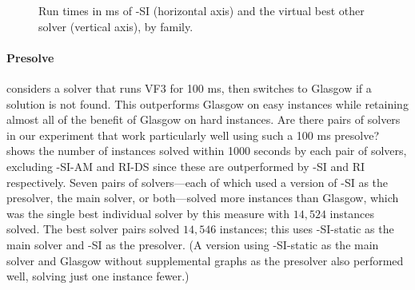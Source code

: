 \begin{figure}[htb]
    \caption{Run times in ms of \McSplit-SI (horizontal axis) and the virtual best other solver (vertical axis), by family.}
    \label{figure:mcsplitsi-vbs-scatter-by-family}
\end{figure}

\paragraph*{Presolve} \cite{DBLP:conf/gbrpr/Solnon19} considers a solver that
runs VF3 for 100 ms, then switches to Glasgow if a solution is not found. This
outperforms Glasgow on easy instances while retaining almost all of the benefit
of Glasgow on hard instances.  Are there pairs of solvers in our experiment
that work particularly well using such a 100 ms presolve?
 shows the number of instances solved
within 1000 seconds by each pair of solvers, excluding \McSplit-SI-AM and RI-DS
since these are outperformed by \McSplit-SI and RI respectively.
Seven pairs of solvers---each of which used a version of \McSplit-SI
as the presolver, the main solver, or both---solved more instances than Glasgow,
which was the single
best individual solver by this measure with $14,524$ instances solved.
The best solver pairs
solved $14,546$ instances; this uses \McSplit-SI-static as the main
solver and \McSplit-SI as the presolver.
(A version using \McSplit-SI-static as the main solver and
Glasgow without supplemental graphs as the presolver
also performed well, solving just one instance fewer.)

